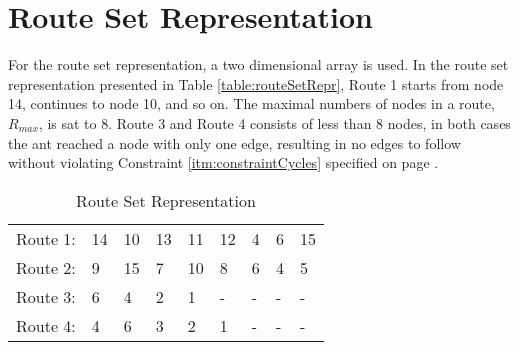 \section{Route Set Representation}
For the route set representation, a two dimensional array is used. In the route set representation presented in Table \vref{table:routeSetRepr}, Route 1 starts from node 14, continues to node 10, and so on. The maximal numbers of nodes in a route, $R_{max}$, is sat to 8. Route 3 and Route 4 consists of less than 8 nodes, in both cases the ant reached a node with only one edge, resulting in no edges to follow without violating Constraint \ref{itm:constraintCycles} specified on page \pageref{itm:constraintCycles}.
\begin{table}[H]
    \begin{center}
        \begin{tabular}{|l| l l l l l l l l|}
      \hline
        Route 1: & 14 & 10 & 13 & 11 & 12 & 4 & 6 & 15 \\
        Route 2: & 9 & 15 & 7 & 10 & 8 & 6 & 4 & 5 \\
        Route 3: & 6 & 4 & 2 & 1 & - & - & - & - \\
        Route 4: & 4 & 6 & 3 & 2 & 1 & - & - & - \\
      \hline
        \end{tabular}
    \end{center}
    \caption {Route Set Representation}
    \label{table:routeSetRepr}
\end{table}